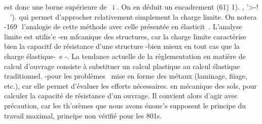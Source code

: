 est donc une borne supérieure de ~i . On en déduit un encadrement 
(61) 1). , '>-! ~ '). 
qui permet d'approcher relativement simplement la charge limite. On notera 
-169 ­
l'analogie de cette méthode avec celle présentée en élasticit~. 
L'analyse limite est utilis'e 
-en mfcanique des structures, car la charge limite caractérise bien la capacitf de résistance d'une structure -bien mieux en tout cas que la charge élastique-~e -. La tendance actuelle de la règlementation en matiè­re de calcul d'ouvrage consiste à substituer un calcul plastique au calcul élastique traditionnel. 
-pour les problèmes ~mise en forme des métaux (laminage, fiiage, etc.), car elle permet d'évaluer les efforts nécessaires. 
en mécanique des sols, pour calculer la capacité de résistance d'un ouvrage. Il convient alors d'agir avec précaution, car les th'orèmes que nous avons énonc's supposent le principe du travail maximal, principe non vérifié pour les 801s. 
